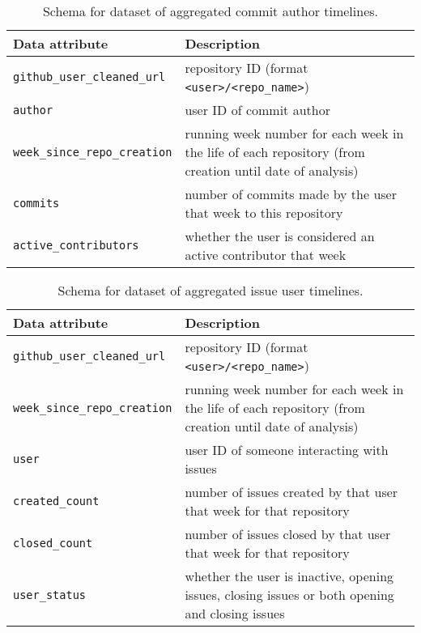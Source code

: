 \documentclass[10pt,a4paper]{scrartcl}
\begin{document}
\begin{table}
    \centering
    \begin{tabular}{|l|l|}
        \hline
        Data attribute & Description \\
        \hline
        \verb|github_user_cleaned_url| & repository ID (format \verb|<user>/<repo_name>|) \\
        \verb|author| & user ID of commit author \\
        \verb|week_since_repo_creation| & running week number for each week in the life of each repository (from creation until date of analysis) \\
        \verb|commits| & number of commits made by the user that week to this repository \\
        \verb|active_contributors| & whether the user is considered an active contributor that week \\
        \hline
    \end{tabular}
    \caption{Schema for dataset of aggregated commit author timelines.}
    \label{table:schema_agg_commit_author}
\end{table}

\begin{table}
    \centering
    \begin{tabular}{|l|l|}
        \hline
        Data attribute & Description \\
        \hline
        \verb|github_user_cleaned_url| & repository ID (format \verb|<user>/<repo_name>|) \\
        \verb|week_since_repo_creation| & running week number for each week in the life of each repository (from creation until date of analysis) \\
        \verb|user| & user ID of someone interacting with issues \\
        \verb|created_count| & number of issues created by that user that week for that repository \\
        \verb|closed_count| & number of issues closed by that user that week for that repository \\
        \verb|user_status| & whether the user is inactive, opening issues, closing issues or both opening and closing issues \\
        \hline
    \end{tabular}
    \caption{Schema for dataset of aggregated issue user timelines.}
    \label{table:schema_agg_issue_users}
\end{table}
\end{document}
